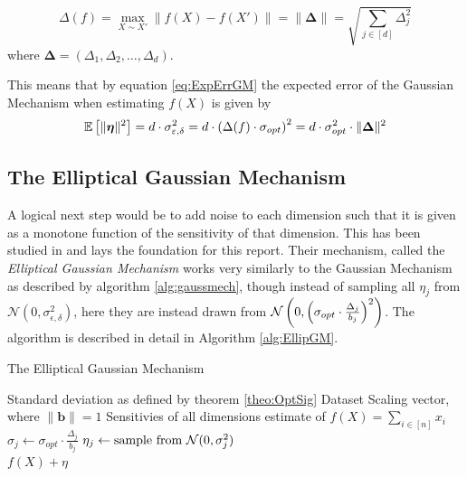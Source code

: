 \documentclass[a4paper,12pt]{article}
\newcommand{\Desc}[2]{\State \makebox[6em][l]{#1}#2}
\begin{document}
\begin{equation}
\label{eq:DelF}
    \Delta(f) = \max_{X \sim X'} \| f(X) - f(X') \| = 
    \|\bm{\Delta}\| =  \sqrt{\sum_{j \in [d]} \Delta_j^2} 
\end{equation}
where $\bm{\Delta} = (\Delta_1, \Delta_2, \dots, \Delta_d)$.

\noindent This means that by equation \eqref{eq:ExpErrGM} the expected error of the Gaussian Mechanism when estimating $f(X)$ is given by
\begin{equation}
\label{eq:GMErr}
    \mathbb{E} \left [ \| \bm{\eta} \|^2 \right] = d \cdot \sigma_{\varepsilon, \delta}^2 = d \cdot \left (\Delta(f) \cdot \sigma_{opt}\right)^2 =
    d  \cdot \sigma_{opt}^2 \cdot \| \bm{\Delta} \|^2 
\end{equation}
\subsection{The Elliptical Gaussian Mechanism}
A logical next step would be to add noise to each dimension such that it is given as a monotone function of the sensitivity of that dimension.
This has been studied in \cite{Lebeda2022} and lays the foundation for this report. Their mechanism, called the \textit{Elliptical Gaussian Mechanism}
works very similarly to the Gaussian Mechanism as described by algorithm \ref{alg:gaussmech}, though instead of sampling all $\eta_j$ from 
$\mathcal{N}(0,\sigma_{\epsilon, \delta}^2)$, here they are instead drawn from $\mathcal{N}\left (0,\left (\sigma_{opt}\cdot \frac{\Delta_j}{b_j}\right)^2\right)$. 
The algorithm is described in detail in Algorithm \ref{alg:EllipGM}.

\begin{algorithm}
\caption{The Elliptical Gaussian Mechanism}\label{alg:EllipGM}
\begin{algorithmic}
    \Input
    \Desc{$\sigma_{opt}$}{Standard deviation as defined by theorem \ref{theo:OptSig}}
    \Desc{$X \in \R^{n \times d}$}{Dataset}
    \Desc{$\bm{b} \in \R^{d}$}{Scaling vector, where $\|\bm{b}\| = 1$}
    \Desc{$\bm{\Delta} \in \R^{d}$}{Sensitivies of all dimensions}
    \EndInput
    \Output
    \State \edp estimate of $f(X) = \sum_{i \in [n]} x_i$
    \EndOutput
        \State $\sigma_j \gets \sigma_{opt} \cdot \frac{\Delta_j}{b_j}$
        \State $\eta_j \gets \textnormal{sample from } \mathcal{N}(0, \sigma_j^2)$
    \EndFor \\
    \Return $f(X) + \eta$
\end{algorithmic}
\end{algorithm}
\end{document}
